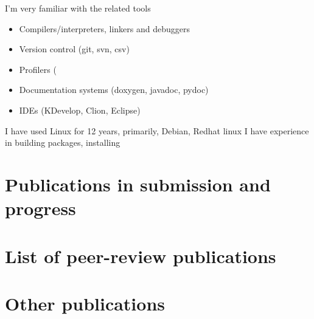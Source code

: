 \documentclass[a4paper,10pt]{article} %
\begin{document}
{I'm very familiar with the related tools
\begin{itemize}
\item Compilers/interpreters, linkers and debuggers
\item Version control (git, svn, csv)
\item Profilers (
\item Documentation systems (doxygen, javadoc, pydoc)
\item IDEs (KDevelop, Clion, Eclipse)
\end{itemize}

I have used Linux for 12 years, primarily, Debian, Redhat linux
I have experience in building packages, installing

\section{Publications in submission and progress}






\section{List of peer-review publications}




\section{Other publications}








}
\end{document}
